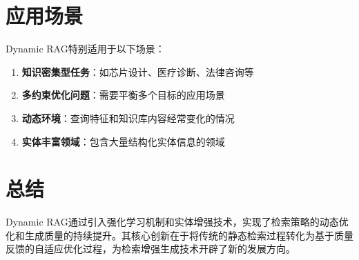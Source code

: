 \documentclass{ctexart}
\begin{document}
\section{应用场景}

Dynamic RAG特别适用于以下场景：

\begin{enumerate}
    \item \textbf{知识密集型任务}：如芯片设计、医疗诊断、法律咨询等
    \item \textbf{多约束优化问题}：需要平衡多个目标的应用场景
    \item \textbf{动态环境}：查询特征和知识库内容经常变化的情况
    \item \textbf{实体丰富领域}：包含大量结构化实体信息的领域
\end{enumerate}

\section{总结}

Dynamic RAG通过引入强化学习机制和实体增强技术，实现了检索策略的动态优化和生成质量的持续提升。其核心创新在于将传统的静态检索过程转化为基于质量反馈的自适应优化过程，为检索增强生成技术开辟了新的发展方向。
\end{document}

